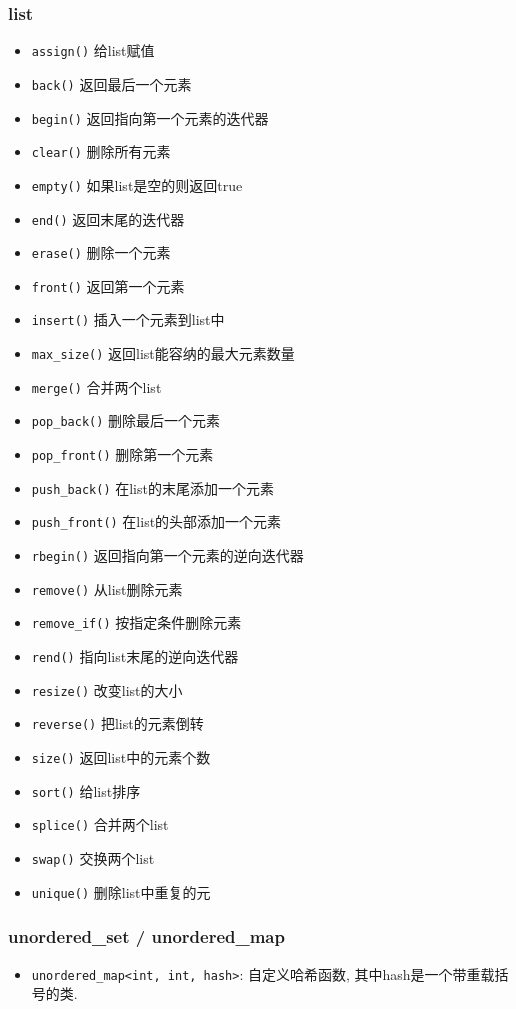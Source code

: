 \subsubsection{list}
	\begin{itemize}
		\item \texttt{assign()} 给list赋值 
		\item \texttt{back()} 返回最后一个元素 
		\item \texttt{begin()} 返回指向第一个元素的迭代器 
		\item \texttt{clear()} 删除所有元素 
		\item \texttt{empty()} 如果list是空的则返回true 
		\item \texttt{end()} 返回末尾的迭代器
		\item \texttt{erase()} 删除一个元素
		\item \texttt{front()} 返回第一个元素
		\item \texttt{insert()} 插入一个元素到list中
		\item \texttt{max_size()} 返回list能容纳的最大元素数量
		\item \texttt{merge()} 合并两个list
		\item \texttt{pop_back()} 删除最后一个元素
		\item \texttt{pop_front()} 删除第一个元素
		\item \texttt{push_back()} 在list的末尾添加一个元素
		\item \texttt{push_front()} 在list的头部添加一个元素
		\item \texttt{rbegin()} 返回指向第一个元素的逆向迭代器
		\item \texttt{remove()} 从list删除元素
		\item \texttt{remove_if()} 按指定条件删除元素
		\item \texttt{rend()} 指向list末尾的逆向迭代器
		\item \texttt{resize()} 改变list的大小
		\item \texttt{reverse()} 把list的元素倒转
		\item \texttt{size()} 返回list中的元素个数
		\item \texttt{sort()} 给list排序
		\item \texttt{splice()} 合并两个list
		\item \texttt{swap()} 交换两个list
		\item \texttt{unique()} 删除list中重复的元
	\end{itemize}

\subsubsection{unordered\_set / unordered\_map}

\begin{itemize}
	\item \texttt{unordered_map<int, int, hash>}: 自定义哈希函数, 其中hash是一个带重载括号的类.
\end{itemize}